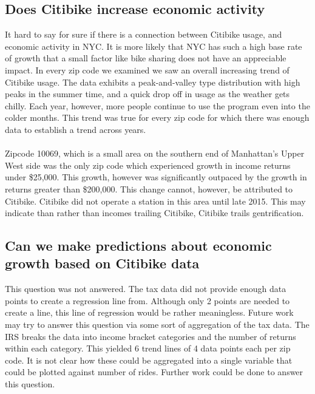 \documentclass{article}
\begin{document}
\subsection{Does Citibike increase economic activity}
It hard to say for sure if there is a connection between Citibike usage, and economic activity in NYC. It is more likely that NYC has such a high base rate of growth that a small factor like bike sharing does not have an appreciable impact. In every zip code we examined we saw an overall increasing trend of Citibike usage. The data exhibits a peak-and-valley type distribution with high peaks in the summer time, and a quick drop off in usage as the weather gets chilly. Each year, however, more people continue to use the program even into the colder months. This trend was true for every zip code for which there was enough data to establish a trend across years.
\paragraph{}
Zipcode 10069, which is a small area on the southern end of Manhattan's Upper West side was the only zip code which experienced growth in income returns under \$25,000. This growth, however was significantly outpaced by the growth in returns greater than \$200,000. This change cannot, however, be attributed to Citibike. Citibike did not operate a station in this area until late 2015. This may indicate than rather than incomes trailing Citibike, Citibike trails gentrification.

\subsection{Can we make predictions about economic growth based on Citibike data}
This question was not answered. The tax data did not provide enough data points to create a regression line from. Although only 2 points are needed to create a line, this line of regression would be rather meaningless. Future work may try to answer this question via some sort of aggregation of the tax data. The IRS breaks the data into income bracket categories and the number of returns within each category. This yielded 6 trend lines of 4 data points each per zip code. It is not clear how these could be aggregated into a single variable that could be plotted against number of rides. Further work could be done to answer this question.

\clearpage
{}%
\renewcommand*{\thepage}{A-\arabic{page}}
\appendix
\end{document}

